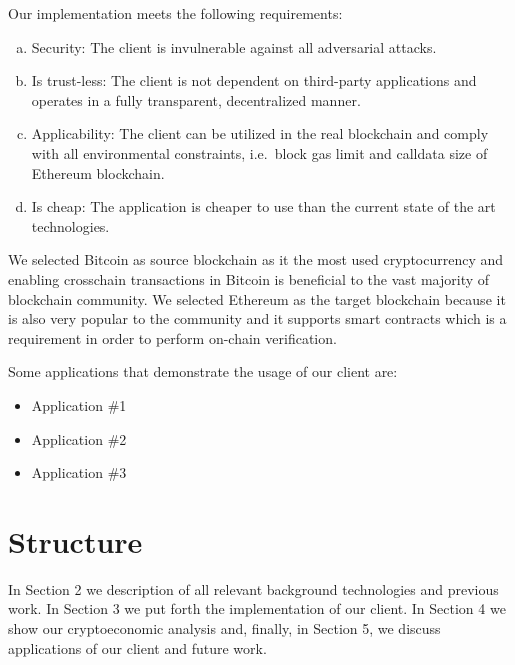\bigbreak
Our implementation meets the following requirements:
\begin{enumerate}[(a)]

    \item
        Security: The client is invulnerable against all adversarial attacks.

    \item Is trust-less: The client is not dependent on third-party
        applications and operates in a fully transparent, decentralized manner.

    \item Applicability: The client can be utilized in the real blockchain and
        comply with all environmental constraints, i.e.\ block gas limit and
        calldata size of Ethereum blockchain.

    \item Is cheap: The application is cheaper to use than the current state of
        the art technologies.

\end{enumerate}

We selected Bitcoin as source blockchain as it the most used cryptocurrency and
enabling crosschain transactions in Bitcoin is beneficial to the vast majority
of blockchain community. We selected Ethereum as the target blockchain because
it is also very popular to the community and it supports smart contracts which
is a requirement in order to perform on-chain verification.

\bigbreak Some applications that demonstrate the usage of our client are:

\begin{itemize}
    \item{Application \#1}
    \item{Application \#2}
    \item{Application \#3}
\end{itemize}

\section{Structure}

In Section 2 we description of all relevant background technologies and
previous work. In Section 3 we put forth the implementation of our client. In
Section 4 we show our cryptoeconomic analysis and, finally, in Section 5, we
discuss applications of our client and future work.
